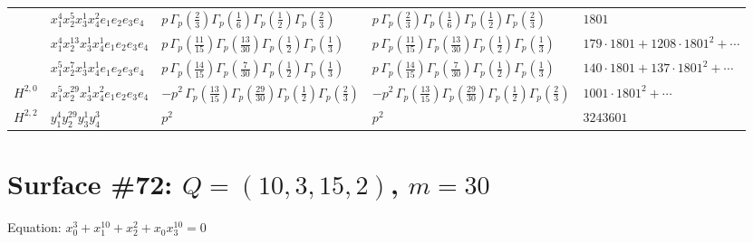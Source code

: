 \documentclass[11pt]{article}
\begin{document}
\begin{table}[ht]
{\begin{tabular}{@{}lllll@{}}
 & $x_{1}^{4} x_{2}^{5} x_{3}^{1} x_{4}^{2}  e_{1} e_{2} e_{3} e_{4}$ & $p \, \Gamma_p \left( \frac{2}{3} \right) \Gamma_p \left( \frac{1}{6} \right) \Gamma_p \left( \frac{1}{2} \right) \Gamma_p \left( \frac{2}{3} \right)$ & $p \, \Gamma_p \left( \frac{2}{3} \right) \Gamma_p \left( \frac{1}{6} \right) \Gamma_p \left( \frac{1}{2} \right) \Gamma_p \left( \frac{2}{3} \right)$ & $1801$ \\
 & $x_{1}^{4} x_{2}^{13} x_{3}^{1} x_{4}^{1}  e_{1} e_{2} e_{3} e_{4}$ & $p \, \Gamma_p \left( \frac{11}{15} \right) \Gamma_p \left( \frac{13}{30} \right) \Gamma_p \left( \frac{1}{2} \right) \Gamma_p \left( \frac{1}{3} \right)$ & $p \, \Gamma_p \left( \frac{11}{15} \right) \Gamma_p \left( \frac{13}{30} \right) \Gamma_p \left( \frac{1}{2} \right) \Gamma_p \left( \frac{1}{3} \right)$ & $179{\cdot}1801{+}1208{\cdot}1801^{2}{+}\cdots$ \\
 & $x_{1}^{5} x_{2}^{7} x_{3}^{1} x_{4}^{1}  e_{1} e_{2} e_{3} e_{4}$ & $p \, \Gamma_p \left( \frac{14}{15} \right) \Gamma_p \left( \frac{7}{30} \right) \Gamma_p \left( \frac{1}{2} \right) \Gamma_p \left( \frac{1}{3} \right)$ & $p \, \Gamma_p \left( \frac{14}{15} \right) \Gamma_p \left( \frac{7}{30} \right) \Gamma_p \left( \frac{1}{2} \right) \Gamma_p \left( \frac{1}{3} \right)$ & $140{\cdot}1801{+}137{\cdot}1801^{2}{+}\cdots$ \\
\midrule
$H^{2,0}$ & $x_{1}^{5} x_{2}^{29} x_{3}^{1} x_{4}^{2}  e_{1} e_{2} e_{3} e_{4}$ & $- p^{2} \, \Gamma_p \left( \frac{13}{15} \right) \Gamma_p \left( \frac{29}{30} \right) \Gamma_p \left( \frac{1}{2} \right) \Gamma_p \left( \frac{2}{3} \right)$ & $- p^{2} \, \Gamma_p \left( \frac{13}{15} \right) \Gamma_p \left( \frac{29}{30} \right) \Gamma_p \left( \frac{1}{2} \right) \Gamma_p \left( \frac{2}{3} \right)$ & $1001{\cdot}1801^{2}{+}\cdots$ \\
\midrule
$H^{2,2}$ & $y_{1}^{4} y_{2}^{29} y_{3}^{1} y_{4}^{3}$ & $p^{2} \,$ & $p^{2} \,$ & $3243601$ \\
\bottomrule
\end{tabular}
}
\renewcommand{\arraystretch}{1.0}
\end{table}

\newpage

\section*{Surface \#72: $Q=(10, 3, 15, 2)$, $m=30$}

Equation: $x_0^{3} + x_1^{10} + x_2^{2} + x_0 x_3^{10} = 0$
\end{document}
